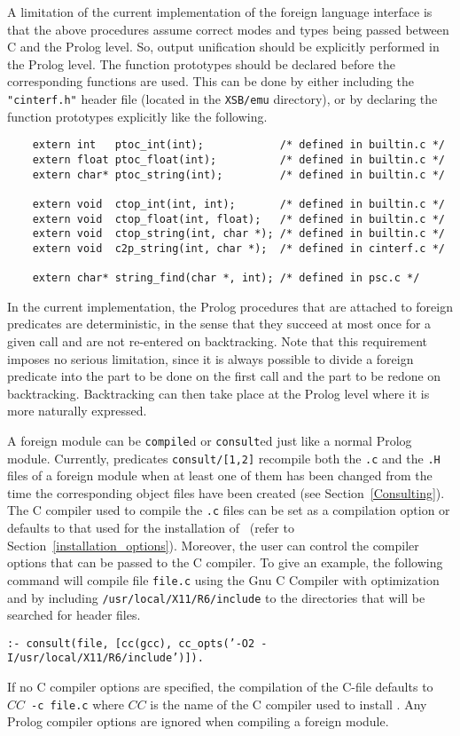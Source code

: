 A limitation of the current implementation of the foreign language
interface is that the above procedures assume correct modes and types
being passed between C and the Prolog level.  So, output unification
should be explicitly performed in the Prolog level.  The function
prototypes should be declared before the corresponding functions are
used.  This can be done by either including the {\tt "cinterf.h"} header
file (located in the {\tt XSB/emu} directory), or by declaring the
function prototypes explicitly like the following.
\begin{verbatim}
    extern int   ptoc_int(int);            /* defined in builtin.c */
    extern float ptoc_float(int);          /* defined in builtin.c */
    extern char* ptoc_string(int);         /* defined in builtin.c */
 
    extern void  ctop_int(int, int);       /* defined in builtin.c */
    extern void  ctop_float(int, float);   /* defined in builtin.c */
    extern void  ctop_string(int, char *); /* defined in builtin.c */
    extern void  c2p_string(int, char *);  /* defined in cinterf.c */

    extern char* string_find(char *, int); /* defined in psc.c */
\end{verbatim}

In the current implementation, the Prolog procedures that are
attached to foreign predicates are deterministic, in the sense that
they succeed at most once for a given call and are not re-entered on
backtracking.  Note that this requirement imposes no serious
limitation, since it is always possible to divide a foreign predicate
into the part to be done on the first call and the part to be redone
on backtracking.  Backtracking can then take place at the Prolog
level where it is more naturally expressed.

A foreign module can be {\tt compile}d or {\tt consult}ed just like a
normal Prolog module.  Currently, predicates {\tt consult/[1,2]}
recompile both the {\tt *.c} and the {\tt *.H} files of a foreign
module when at least one of them has been changed from the time the
corresponding object files have been created (see Section~\ref{Consulting}).
The C compiler used to compile the {\tt *.c} files can be set as a
compilation option or defaults to that used for the installation of
\ourprolog\ (refer to Section~\ref{installation_options}).
Moreover, the user can control the compiler options that can be passed
to the C compiler.  To give an example, the following command will
compile file {\tt file.c} using the Gnu C Compiler with optimization
and by including {\tt /usr/local/X11/R6/include} to the directories that
will be searched for header files.
\begin{center}
{\tt  :- consult(file,
		 [cc(gcc), cc\_opts('-O2 -I/usr/local/X11/R6/include')]). }
\end{center}
If no C compiler options are specified, the compilation of the C-file
defaults to $CC$~{\tt -c~file.c} where $CC$ is the name of the C compiler
used to install \ourprolog.
Any Prolog compiler options are ignored when compiling a foreign module.

